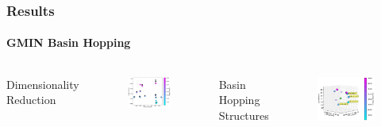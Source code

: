 \documentclass[english]{beamer}
\begin{document}
\begin{frame}
    \frametitle{Results}
    \framesubtitle{GMIN Basin Hopping} 

    \vspace{0.10\topmargin}

    \begin{columns}[t]
        \centering
        Dimensionality Reduction
        \begin{figure}
            \includegraphics[width=1.0\textwidth]{figures/CitA_phi.png}
        \end{figure}      

        \centering
        Basin Hopping Structures
        \begin{figure}
            \includegraphics[width=1.0\textwidth]{figures/GMIN/CitA_phi_theta_3D.pdf}
        \end{figure}     

    \end{columns}  

\end{frame}     
\end{document}
